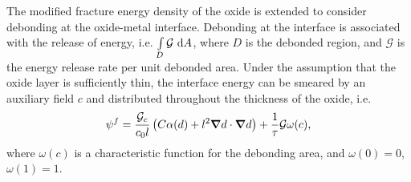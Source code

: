 The modified fracture energy density of the oxide is extended to consider debonding at the oxide-metal interface. Debonding at the interface is associated with the release of energy, i.e. $\int\limits_D \mathcal{G} \text{ d}A$, where $D$ is the debonded region, and $\mathcal{G}$ is the energy release rate per unit debonded area. Under the assumption that the oxide layer is sufficiently thin, the interface energy can be smeared by an auxiliary field $c$ and distributed throughout the thickness of the oxide, i.e.
\begin{align}
  \psi^f = \dfrac{{\mathcal{G}_c}}{c_0 l} \left( C\alpha(d) + l^2 \boldsymbol{\nabla} d \cdot \boldsymbol{\nabla} d \right) + \dfrac{1}{\tau} \mathcal{G} \omega(c),
\end{align}
where $\omega(c)$ is a characteristic function for the debonding area, and $\omega(0) = 0$, $\omega(1) = 1$.

